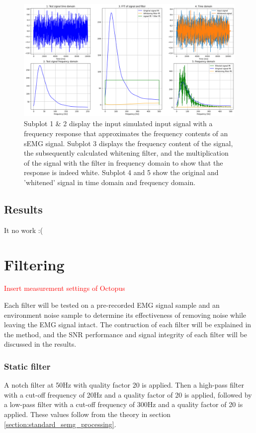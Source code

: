 \begin{figure}[h!t]
	\begin{center}
		\includegraphics[height=60mm]{images/prewhitening_simulation.png}
	\end{center}
	\caption{Subplot 1 & 2 display the input simulated input signal with a frequency response that approximates the frequency contents of an sEMG signal. Subplot 3 displays the frequency content of the signal, the subsequently calculated whitening filter, and the multiplication of the signal with the filter in frequency domain to show that the response is indeed white. Subplot 4 and 5 show the original and 'whitened' signal in time domain and frequency domain.}
	\label{fig:whitening_simulation}
\end{figure}


\subsection{Results}
It no work :(


\section{Filtering}

\textcolor{red}{Insert measurement settings of Octopus}

Each filter will be tested on a pre-recorded EMG signal sample and an environment noise sample to determine its effectiveness of removing noise while leaving the EMG signal intact. The contruction of each filter will be explained in the method, and the SNR performance and signal integrity of each filter will be discussed in the results. 

\subsubsection{Static filter}
A notch filter at 50Hz with quality factor 20 is applied. Then a high-pass filter with a cut-off frequency of 20Hz and a quality factor of 20 is applied, followed by a low-pass filter with a cut-off frequency of 300Hz and a quality factor of 20 is applied. These values follow from the theory in section \ref{section:standard_semg_processing}.

